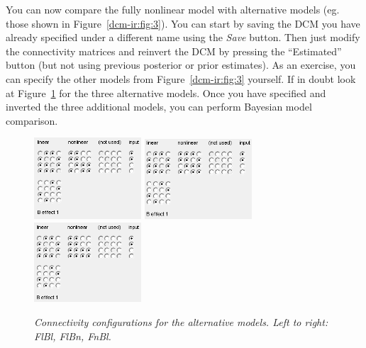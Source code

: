 You can now compare the fully nonlinear model with alternative models (eg. those shown in Figure~\ref{dcm-ir:fig:3}). You can start by saving the DCM you have already specified under a different name using the \textit{Save} button. Then just modify the connectivity matrices and reinvert the DCM by pressing the ``Estimated'' button (but not using previous posterior or prior estimates). As an exercise, you can specify the other models from Figure~\ref{dcm-ir:fig:3} yourself. If in doubt look at Figure~\ref{dcm-ir:fig:5} for the three alternative models. Once you have specified and inverted the three additional models, you can perform Bayesian model comparison. 

\begin{figure}
\begin{center}
\includegraphics[width=40mm]{dcm_ir/figures/irfigure5_FlBl}
\includegraphics[width=40mm]{dcm_ir/figures/irfigure5_FlBn}
\includegraphics[width=40mm]{dcm_ir/figures/irfigure5_FnBl}
\caption{\em Connectivity configurations for the alternative models. Left to right: FlBl, FlBn, FnBl. \label{dcm-ir:fig:5}}
\end{center}
\end{figure}

